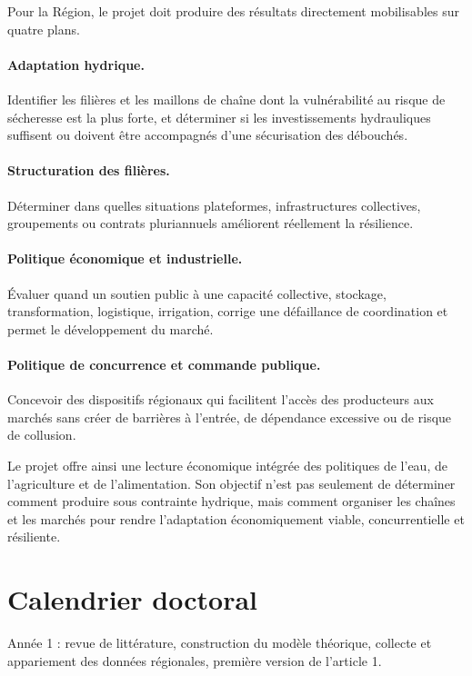 \documentclass[11pt,a4paper]{article}
\begin{document}
Pour la Région, le projet doit produire des résultats directement mobilisables sur quatre plans.

\paragraph{Adaptation hydrique.}
Identifier les filières et les maillons de chaîne dont la vulnérabilité au risque de sécheresse est la plus forte, et déterminer si les investissements hydrauliques suffisent ou doivent être accompagnés d'une sécurisation des débouchés.

\paragraph{Structuration des filières.}
Déterminer dans quelles situations plateformes, infrastructures collectives, groupements ou contrats pluriannuels améliorent réellement la résilience.

\paragraph{Politique économique et industrielle.}
Évaluer quand un soutien public à une capacité collective, stockage, transformation, logistique, irrigation, corrige une défaillance de coordination et permet le développement du marché.

\paragraph{Politique de concurrence et commande publique.}
Concevoir des dispositifs régionaux qui facilitent l'accès des producteurs aux marchés sans créer de barrières à l'entrée, de dépendance excessive ou de risque de collusion.

Le projet offre ainsi une lecture économique intégrée des politiques de l'eau, de l'agriculture et de l'alimentation. Son objectif n'est pas seulement de déterminer comment produire sous contrainte hydrique, mais comment organiser les chaînes et les marchés pour rendre l'adaptation économiquement viable, concurrentielle et résiliente.

\section{Calendrier doctoral}

Année 1 : revue de littérature, construction du modèle théorique, collecte et appariement des données régionales, première version de l'article 1.
\end{document}
